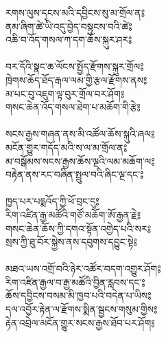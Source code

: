 རགས་ལུས་དྭངས་མའི་དབྱིངས་སུ་མ་གྲོལ་ན༔\\
ནམ་ཞིག་ཚེ་ཡི་འདུ་བྱེད་བསྟུངས་བའི་ཚེ༔\\
འཆི་བ་འོད་གསལ་ཀ་དག་ཆོས་སྐུར་ཤར༔\\
\\
བར་དོའི་སྣང་ཆ་ལོངས་སྤྱོད་རྫོགས་སྐུར་གྲོལ༔\\
ཁྲེགས་ཆོད་ཐོད་རྒལ་ལམ་གྱི་རྩལ་རྫོགས་ནས༔\\
མ་པང་བུ་འཇུག་ལྟ་བུར་གྲོལ་བར་ཤོག༔\\
གསང་ཆེན་འོད་གསལ་ཐེག་པ་མཆོག་གི་རྩེ༔\\
\\
སངས་རྒྱས་གཞན་ནས་མི་འཚོལ་ཆོས་སྐུའི་ཞལ༔\\
མངོན་གྱུར་གདོད་མའི་ས་ལ་མ་གྲོལ་ན༔\\
མ་བསྒོམས་སངས་རྒྱས་ཆོས་ལྔའི་ལམ་མཆོག་ལ༔\\
བརྟེན་ནས་རང་བཞིན་སྤྲུལ་བའི་ཞིང་ལྔ་དང་༔\\
\\
ཁྱད་པར་པདྨའོད་ཀྱི་ཕོ་བྲང་དུ༔\\
རིག་འཛིན་རྒྱ་མཚོའི་གཙོ་མཆོག་ཨོ་རྒྱན་རྗེ༔\\
གསང་ཆེན་ཆོས་ཀྱི་དགའ་སྟོན་འགྱེད་པའི་སར༔\\
སྲས་ཀྱི་ཐུ་བོར་སྐྱེས་ནས་དབུགས་དབྱུང་སྟེ༔\\
\\
མཐའ་ཡས་འགྲོ་བའི་ཉེར་འཚོར་བདག་འགྱུར་ཤོག༔\\
རིག་འཛིན་རྒྱལ་བ་རྒྱ་མཚོའི་བྱིན་རླབས་དང་༔\\
ཆོས་དབྱིངས་བསམ་མི་ཁྱབ་པའི་བདེན་པ་ཡིས༔\\
དལ་འབྱོར་རྟེན་ལ་རྫོགས་སྨིན་སྦྱངས་གསུམ་གྱིས༔\\
རྟེན་འབྲེལ་མངོན་གྱུར་སངས་རྒྱས་ཐོབ་པར་ཤོག༔\\
\\

